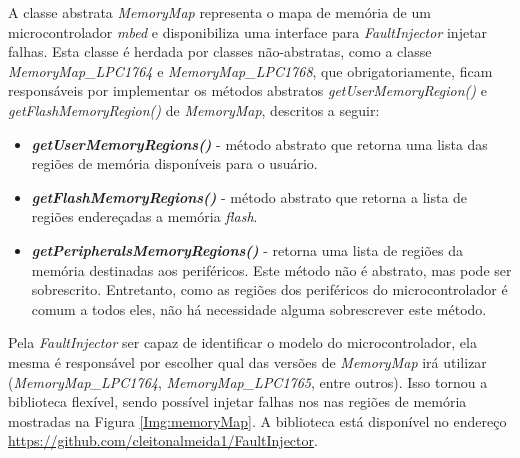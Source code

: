A classe abstrata \textit{MemoryMap} representa o mapa de memória de um microcontrolador \textit{mbed} e disponibiliza uma interface para \textit{FaultInjector} injetar falhas. Esta classe é herdada por classes não-abstratas, como a classe \textit{MemoryMap\_LPC1764} e \textit{MemoryMap\_LPC1768}, que obrigatoriamente, ficam responsáveis por implementar os métodos abstratos \textit{getUserMemoryRegion()} e \textit{getFlashMemoryRegion()} de \textit{MemoryMap}, descritos a seguir:

\begin{itemize}
	\item \textbf{\textit{getUserMemoryRegions()}} - método abstrato que retorna uma lista das regiões de memória disponíveis para o usuário.				
	
	\item \textbf{\textit{getFlashMemoryRegions()}} - método abstrato que retorna a lista de regiões endereçadas a memória \textit{flash}.
	
	\item \textbf{\textit{getPeripheralsMemoryRegions()}} - retorna uma lista de regiões da memória destinadas aos periféricos. Este método não é abstrato, mas pode ser sobrescrito. Entretanto, como as regiões dos periféricos do microcontrolador é comum a todos eles, não há necessidade alguma sobrescrever este método.
\end{itemize}

Pela \textit{FaultInjector} ser capaz de identificar o modelo do microcontrolador, ela mesma é responsável por escolher qual das versões de \textit{MemoryMap} irá utilizar (\textit{MemoryMap\_LPC1764}, \textit{MemoryMap\_LPC1765}, entre outros). Isso tornou a biblioteca flexível, sendo possível injetar falhas nos nas regiões de memória mostradas na Figura \ref{Img:memoryMap}. A biblioteca está disponível no endereço \url{https://github.com/cleitonalmeida1/FaultInjector}.

